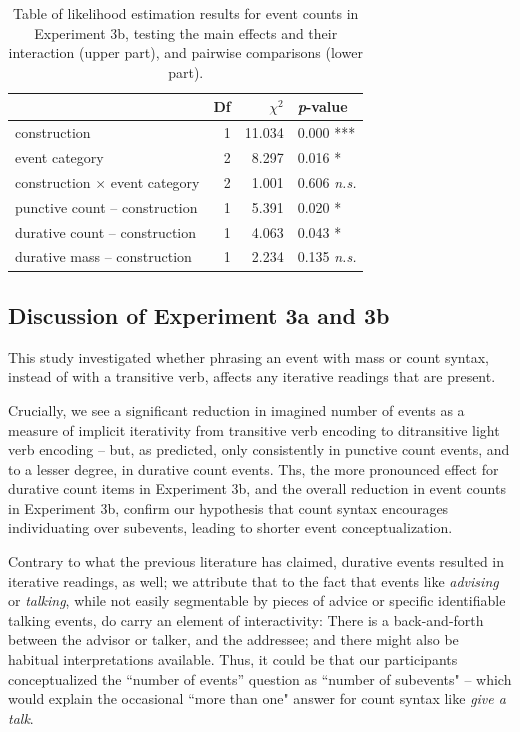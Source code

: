 \documentclass[review,12pt,authoryear]{elsarticle}
\newcommand*{\sectionformat}{\centering}
\begin{document}
\begin{table}[ht]
\centering
\begin{tabular}{lrrl}
  \hline
 & Df &  $\chi^2$ & \emph{p}-value \\ 
  \hline
construction          & 1 &  11.034 & 0.000 *** \\ 
  event category          & 2 &  8.297 & 0.016 *\\ 
  construction $\times$ event category & 2 & 1.001 & 0.606 \emph{n.s.} \\    \hline
   punctive count -- construction    & 1 & 5.391 & 0.020 * \\    
   durative count -- construction    & 1  & 4.063 & 0.043 *\\ 
   durative mass -- construction   & 1 &  2.234 & 0.135 \emph{n.s.}\\ \hline
\end{tabular}
\caption{Table of likelihood estimation results for event counts in Experiment 3b, testing the main effects and their interaction (upper part), and pairwise comparisons (lower part).}
\label{tab_countsregr3b}
\end{table}

\subsection*{\sectionformat Discussion of Experiment 3a and 3b}\label{sec_discHowMany}

This study investigated whether phrasing an event with mass or count syntax, instead of with a transitive verb, affects any iterative readings that are present. 

Crucially, we see a significant reduction in imagined number of events as a measure of implicit iterativity from transitive verb encoding to ditransitive light verb encoding -- but, as predicted, only consistently in punctive count events, and to a lesser degree, in durative count events. Ths, the more pronounced effect for durative count items in Experiment 3b, and the overall reduction in event counts in Experiment 3b, confirm our hypothesis that count syntax encourages individuating over subevents, leading to shorter event conceptualization. 

Contrary to what the previous literature has claimed, durative events resulted in iterative readings, as well; we attribute that to the fact that events like \emph{advising} or \emph{talking}, while not easily segmentable by pieces of advice or specific identifiable talking events, do carry an element of interactivity: There is a back-and-forth between the advisor or talker, and the addressee; and there might also be habitual interpretations available. Thus, it could be that our participants conceptualized the ``number of events'' question as ``number of subevents" -- which would explain the occasional ``more than one" answer for count syntax like \emph{give a talk}. 
\end{document}
